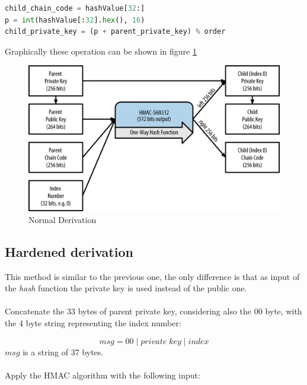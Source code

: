 \begin{lstlisting}[language=Python]
child_chain_code = hashValue[32:]
p = int(hashValue[:32].hex(), 16)
child_private_key = (p + parent_private_key) % order
\end{lstlisting}

\begin{flushleft}
	Graphically these operation can be shown in figure \ref{fig:normal_derivation}
\end{flushleft}

\begin{figure}[ht!]
	\centering
	\includegraphics[width=15cm]{Figures/normal_derivation.png}
	\caption{Normal Derivation }
	\label{fig:normal_derivation}
\end{figure}


\subsection{Hardened derivation}
This method is similar to the previous one, the only difference is that as input of the \textit{hash} function the private key is used instead of the public one. \\ \\
Concatenate the 33 bytes of parent private key, considering also the $00$ byte, with the 4 byte string representing the index number:

\begin{equation*}
msg = 00 \;|\; private\;key \;|\; index
\end{equation*}
$msg$ is a string of $37$ bytes. \\ \\
Apply the HMAC algorithm with the following input:

